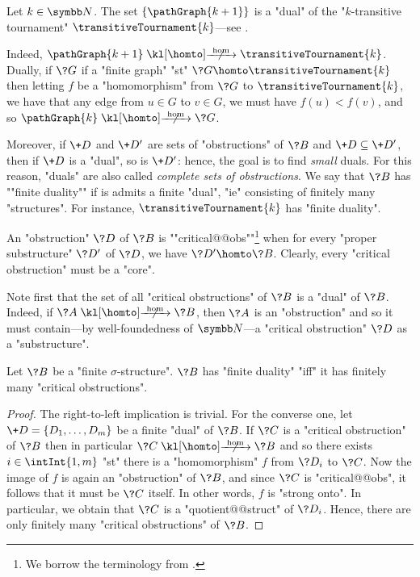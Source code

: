\begin{example}
	\AP\label{ex:dual-T2} Let $k\in\N$. The set
	$\{\pathGraph{k+1}\}$ is a "dual" of the
	"$k$-transitive tournament" $\transitiveTournament{k}$---see .
	
	Indeed, $\pathGraph{k+1} \nothomto \transitiveTournament{k}$. Dually,
	if $\?G$ if a "finite graph" "st" $\?G \homto \transitiveTournament{k}$ then
	letting $f$ be a "homomorphism" from $\?G$ to $\transitiveTournament{k}$,
	we have that any edge from $u \in G$ to $v \in G$, we must have $f(u) < f(v)$,
	and so $\pathGraph{k} \nothomto \?G$.
\end{example}

Moreover, if $\+D$ and $\+D'$ are sets of "obstructions" of $\?B$ and $\+D \subseteq \+D'$,
then if $\+D$ is a "dual", so is $\+D'$: hence, the goal is to find \emph{small} duals.
For this reason, "duals" are also called \emph{complete sets of obstructions}.
We say that $\?B$ has \AP""finite duality"" if is admits a finite "dual", "ie"
consisting of finitely many "structures". For instance, $\transitiveTournament{k}$ has "finite duality".

An "obstruction" $\?D$ of $\?B$ is \AP""critical@@obs""\footnote{We borrow the terminology
from \cite{LaroseLotenTardif2007CharacterisationFOCSP}.} when for every
"proper substructure" $\?D'$ of $\?D$, we have $\?D' \homto \?B$.
Clearly, every "critical obstruction" must be a "core".

Note first that the set of all "critical obstructions" of $\?B$ is a "dual" of $\?B$.
Indeed, if $\?A \nothomto \?B$, then $\?A$ is an "obstruction" and so it must contain---by well-foundedness of $\N$---a "critical obstruction" $\?D$ as a "substructure".

\begin{proposition}
	\label{prop:finite-duality-iff-critical-obstructions}
	Let $\?B$ be a "finite $\sigma$-structure". $\?B$ has "finite duality"
	"iff" it has finitely many "critical obstructions".
\end{proposition}

\begin{proof}
	The right-to-left implication is trivial. For the converse one,
	let $\+D = \{D_1,\dotsc,D_m\}$ be a finite "dual" of $\?B$.
	If $\?C$ is a "critical obstruction" of $\?B$ then in particular $\?C \nothomto \?B$
	and so there exists $i \in \intInt{1,m}$ "st" there is a "homomorphism" $f$ 
	from $\?D_i$ to $\?C$. Now the image of $f$ is again an "obstruction" of $\?B$,
	and since $\?C$ is "critical@@obs", it follows that it must be $\?C$ itself. In other
	words, $f$ is "strong onto". In particular, we obtain that $\?C$ is a "quotient@@struct" of
	$\?D_i$. Hence, there are only finitely many "critical obstructions" of $\?B$.
\end{proof}

